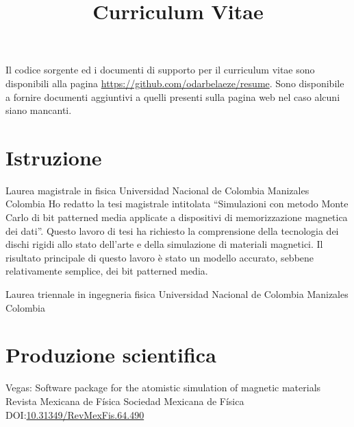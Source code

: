 \documentclass[12pt,english]{moderncv}
\title{Curriculum Vitae}
\begin{document}
\maketitle

\begin{centering}
    Il codice sorgente ed i documenti di supporto per il curriculum vitae sono disponibili alla pagina \url{https://github.com/odarbelaeze/resume}. 
    Sono disponibile a fornire documenti aggiuntivi a quelli presenti sulla pagina web nel caso alcuni siano mancanti.
\end{centering}


\section{Istruzione}

        {Laurea magistrale in fisica}
        {Universidad Nacional de Colombia}
        {Manizales}
        {Colombia}
        {%
            Ho redatto la tesi magistrale intitolata ``Simulazioni con metodo Monte Carlo di bit patterned media applicate a dispositivi di memorizzazione magnetica dei dati''.
            Questo lavoro di tesi ha richiesto la comprensione della tecnologia dei dischi rigidi  allo stato dell'arte e della simulazione di materiali magnetici.
            Il risultato principale di questo lavoro \`e stato un modello accurato, sebbene relativamente semplice, dei bit patterned media. 
        }

        {Laurea triennale in ingegneria fisica}
        {Universidad Nacional de Colombia}
        {Manizales}
        {Colombia}
        {}


\section{Produzione scientifica}

        {Vegas: Software package for the atomistic simulation of magnetic materials}
        {Revista Mexicana de Física}
        {Sociedad Mexicana de Física}
        {}
        {DOI:\@ \href{https://doi.org/10.31349/RevMexFis.64.490}{10.31349/RevMexFis.64.490}}
\end{document}
